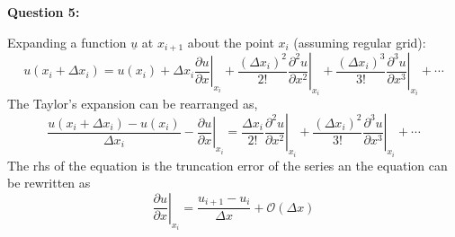 \documentclass[12pts,a4paper,amsmath,amssymb,floatfix]{article}%
\newcommand{\frc}{\displaystyle\frac}
\begin{document}
\clearpage

\begin{flushleft}
{\bf Question 5:}
\end{flushleft}
Expanding a function $\underline{u}$ at $x_{i+1}$ about the point $x_{i}$ (assuming regular grid):
\begin{displaymath}
u\left(x_{i}+\Delta x_{i}\right) = u\left(x_{i}\right) + \Delta x_{i}\left.\frc{\partial u}{\partial x}\right|_{x_{i}} + \frc{\left(\Delta x_{i}\right)^{2}}{2!}\left.\frc{\partial^{2}u}{\partial x^{2}}\right|_{x_{i}} + \frc{\left(\Delta x_{i}\right)^{3}}{3!}\left.\frc{\partial^{3}u}{\partial x^{3}}\right|_{x_{i}} + \cdots 
\end{displaymath}
The Taylor's expansion can be rearranged as,
\begin{displaymath}
\frc{u\left(x_{i}+\Delta x_{i}\right)-u\left(x_{i}\right)}{\Delta x_{i}} - \left.\frc{\partial u}{\partial x}\right|_{x_{i}} = \frc{\Delta x_{i}}{2!}\left.\frc{\partial^{2}u}{\partial x^{2}}\right|_{x_{i}} + \frc{\left(\Delta x_{i}\right)^{2}}{3!}\left.\frc{\partial^{3}u}{\partial x^{3}}\right|_{x_{i}} + \cdots 
\end{displaymath}
The rhs of the equation is the truncation error of the series an the equation can be rewritten as
\begin{displaymath}
\left.\frc{\partial u}{\partial x}\right|_{x_{i}} = \frc{u_{i+1}-u_{i}}{\Delta x} + \mathcal{O}\left(\Delta x\right)
\end{displaymath}
\end{document}
